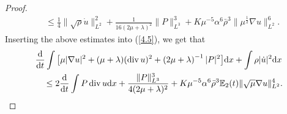 \documentclass[11pt]{article}
\DeclareMathOperator{\divv}{div}
\begin{document}
\begin{proof}
\begin{align*}
& \leq \frac{1}{4} \|\sqrt{\rho} \dot{u}\|_{L^2}^2 + \frac{1}{16 (2 \mu + \lambda )^2} \|P\|_{L^3}^3 + K \mu^{-5} \alpha^6 \bar{\rho}^3 \|\mu^{\frac{1}{2}} \nabla u\|_{L^2}^6.
\end{align*}
Inserting the above estimates into (\ref{4.5}), we get that
\begin{align}\label{4.6}
& \frac{\mathrm{d}}{\mathrm{d} t} \int \big[ \mu |\nabla u|^2 + (\mu + \lambda )(\divv u)^2 + \left( 2 \mu + \lambda \right)^{-1}|P|^2 \big] \mathrm{d} x + \int \rho |\dot{u}|^2 \mathrm{d} x\notag \\
& \quad \leq 2 \frac{\mathrm{d}}{\mathrm{d} t} \int P \divv u \mathrm{d} x + \frac{\|P\|_{L^3}^3}{4 (2 \mu + \lambda )^2} + K \mu^{-5} \alpha^6 \bar{\rho}^3 \mathbb{E}_2 (t) \|\sqrt{\mu}\nabla u\|_{L^2}^4.
\end{align}


\end{proof}
\end{document}
